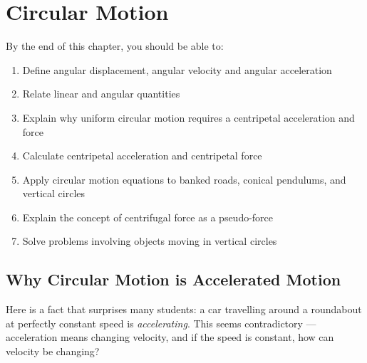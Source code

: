 %

\chapter{Circular Motion}
\label{ch:circular_motion}


\begin{objectivebox}
By the end of this chapter, you should be able to:
\begin{enumerate}[noitemsep]
  \item Define angular displacement, angular velocity
  and angular acceleration
  \item Relate linear and angular quantities
  \item Explain why uniform circular motion requires
  a centripetal acceleration and force
  \item Calculate centripetal acceleration and
  centripetal force
  \item Apply circular motion equations to banked
  roads, conical pendulums, and vertical circles
  \item Explain the concept of centrifugal force as
  a pseudo-force
  \item Solve problems involving objects moving in
  vertical circles
\end{enumerate}
\end{objectivebox}

\vspace{0.4cm}

\minitoc

\vspace{0.5cm}

\section{Why Circular Motion is Accelerated Motion}

Here is a fact that surprises many students: a car
travelling around a roundabout at perfectly constant
speed is \textit{accelerating}. This seems contradictory
--- acceleration means changing velocity, and if the
speed is constant, how can velocity be changing?

